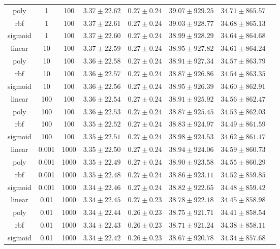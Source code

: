 \begin{tabular}{cccrrrrr}
poly & 1 & 100 & $3.37 \pm 22.62$ & $0.27 \pm 0.24$ & $39.07 \pm 929.25$ & $34.71 \pm 865.57$\\
rbf & 1 & 100 & $3.37 \pm 22.61$ & $0.27 \pm 0.24$ & $39.03 \pm 928.77$ & $34.68 \pm 865.13$\\
sigmoid & 1 & 100 & $3.37 \pm 22.60$ & $0.27 \pm 0.24$ & $38.99 \pm 928.29$ & $34.64 \pm 864.68$\\
linear & 10 & 100 & $3.37 \pm 22.59$ & $0.27 \pm 0.24$ & $38.95 \pm 927.82$ & $34.61 \pm 864.24$\\
poly & 10 & 100 & $3.36 \pm 22.58$ & $0.27 \pm 0.24$ & $38.91 \pm 927.34$ & $34.57 \pm 863.79$\\
rbf & 10 & 100 & $3.36 \pm 22.57$ & $0.27 \pm 0.24$ & $38.87 \pm 926.86$ & $34.54 \pm 863.35$\\
sigmoid & 10 & 100 & $3.36 \pm 22.56$ & $0.27 \pm 0.24$ & $38.95 \pm 926.39$ & $34.60 \pm 862.91$\\
linear & 100 & 100 & $3.36 \pm 22.54$ & $0.27 \pm 0.24$ & $38.91 \pm 925.92$ & $34.56 \pm 862.47$\\
poly & 100 & 100 & $3.36 \pm 22.53$ & $0.27 \pm 0.24$ & $38.87 \pm 925.45$ & $34.53 \pm 862.03$\\
rbf & 100 & 100 & $3.35 \pm 22.52$ & $0.27 \pm 0.24$ & $38.83 \pm 924.97$ & $34.49 \pm 861.59$\\
sigmoid & 100 & 100 & $3.35 \pm 22.51$ & $0.27 \pm 0.24$ & $38.98 \pm 924.53$ & $34.62 \pm 861.17$\\
linear & 0.001 & 1000 & $3.35 \pm 22.50$ & $0.27 \pm 0.24$ & $38.94 \pm 924.06$ & $34.59 \pm 860.73$\\
poly & 0.001 & 1000 & $3.35 \pm 22.49$ & $0.27 \pm 0.24$ & $38.90 \pm 923.58$ & $34.55 \pm 860.29$\\
rbf & 0.001 & 1000 & $3.35 \pm 22.48$ & $0.27 \pm 0.24$ & $38.86 \pm 923.11$ & $34.52 \pm 859.85$\\
sigmoid & 0.001 & 1000 & $3.34 \pm 22.46$ & $0.27 \pm 0.24$ & $38.82 \pm 922.65$ & $34.48 \pm 859.42$\\
linear & 0.01 & 1000 & $3.34 \pm 22.45$ & $0.27 \pm 0.23$ & $38.78 \pm 922.18$ & $34.45 \pm 858.98$\\
poly & 0.01 & 1000 & $3.34 \pm 22.44$ & $0.26 \pm 0.23$ & $38.75 \pm 921.71$ & $34.41 \pm 858.54$\\
rbf & 0.01 & 1000 & $3.34 \pm 22.43$ & $0.26 \pm 0.23$ & $38.71 \pm 921.24$ & $34.38 \pm 858.11$\\
sigmoid & 0.01 & 1000 & $3.34 \pm 22.42$ & $0.26 \pm 0.23$ & $38.67 \pm 920.78$ & $34.34 \pm 857.68$\\

\end{tabular}
